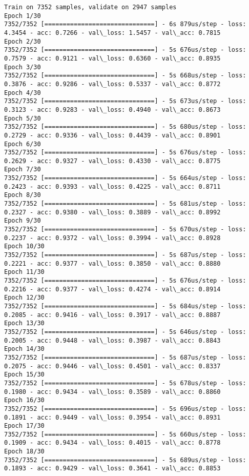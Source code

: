 \documentclass[11pt]{article}
\begin{document}
    \begin{Verbatim}[commandchars=\\\{\}]
Train on 7352 samples, validate on 2947 samples
Epoch 1/30
7352/7352 [==============================] - 6s 879us/step - loss: 4.3454 - acc: 0.7266 - val\_loss: 1.5457 - val\_acc: 0.7815
Epoch 2/30
7352/7352 [==============================] - 5s 676us/step - loss: 0.7579 - acc: 0.9121 - val\_loss: 0.6360 - val\_acc: 0.8935
Epoch 3/30
7352/7352 [==============================] - 5s 668us/step - loss: 0.3876 - acc: 0.9286 - val\_loss: 0.5337 - val\_acc: 0.8772
Epoch 4/30
7352/7352 [==============================] - 5s 673us/step - loss: 0.3123 - acc: 0.9283 - val\_loss: 0.4940 - val\_acc: 0.8673
Epoch 5/30
7352/7352 [==============================] - 5s 680us/step - loss: 0.2729 - acc: 0.9336 - val\_loss: 0.4439 - val\_acc: 0.8901
Epoch 6/30
7352/7352 [==============================] - 5s 676us/step - loss: 0.2629 - acc: 0.9327 - val\_loss: 0.4330 - val\_acc: 0.8775
Epoch 7/30
7352/7352 [==============================] - 5s 664us/step - loss: 0.2423 - acc: 0.9393 - val\_loss: 0.4225 - val\_acc: 0.8711
Epoch 8/30
7352/7352 [==============================] - 5s 681us/step - loss: 0.2327 - acc: 0.9380 - val\_loss: 0.3889 - val\_acc: 0.8992
Epoch 9/30
7352/7352 [==============================] - 5s 670us/step - loss: 0.2237 - acc: 0.9372 - val\_loss: 0.3994 - val\_acc: 0.8928
Epoch 10/30
7352/7352 [==============================] - 5s 687us/step - loss: 0.2221 - acc: 0.9377 - val\_loss: 0.3850 - val\_acc: 0.8880
Epoch 11/30
7352/7352 [==============================] - 5s 676us/step - loss: 0.2216 - acc: 0.9377 - val\_loss: 0.4274 - val\_acc: 0.8914
Epoch 12/30
7352/7352 [==============================] - 5s 684us/step - loss: 0.2085 - acc: 0.9416 - val\_loss: 0.3917 - val\_acc: 0.8887
Epoch 13/30
7352/7352 [==============================] - 5s 646us/step - loss: 0.2005 - acc: 0.9448 - val\_loss: 0.3987 - val\_acc: 0.8843
Epoch 14/30
7352/7352 [==============================] - 5s 687us/step - loss: 0.2075 - acc: 0.9446 - val\_loss: 0.4501 - val\_acc: 0.8337
Epoch 15/30
7352/7352 [==============================] - 5s 678us/step - loss: 0.1980 - acc: 0.9434 - val\_loss: 0.3589 - val\_acc: 0.8860
Epoch 16/30
7352/7352 [==============================] - 5s 696us/step - loss: 0.1891 - acc: 0.9449 - val\_loss: 0.3954 - val\_acc: 0.8931
Epoch 17/30
7352/7352 [==============================] - 5s 660us/step - loss: 0.1909 - acc: 0.9434 - val\_loss: 0.4015 - val\_acc: 0.8778
Epoch 18/30
7352/7352 [==============================] - 5s 689us/step - loss: 0.1893 - acc: 0.9429 - val\_loss: 0.3641 - val\_acc: 0.8853

\end{Verbatim}
\end{document}
